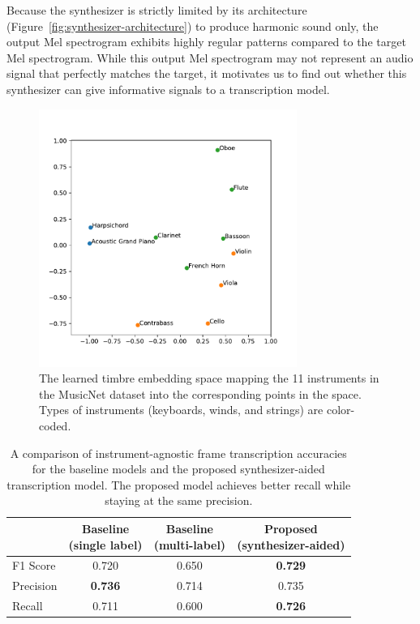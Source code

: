 Because the synthesizer is strictly limited by its architecture (Figure~\ref{fig:synthesizer-architecture}) to produce harmonic sound only, the output Mel spectrogram exhibits highly regular patterns compared to the target Mel spectrogram.
While this output Mel spectrogram may not represent an audio signal that perfectly matches the target, it motivates us to find out whether this synthesizer can give informative signals to a transcription model.

\begin{figure}
	\centering
	\includegraphics[width=0.75\textwidth]{cosine_distance.pdf}
	\vspace{-1em}
	\caption{The learned timbre embedding space mapping the 11 instruments in the MusicNet dataset into the corresponding points in the space. Types of instruments (keyboards, winds, and strings) are color-coded.}\label{fig:learned-timbre-embedding}
\end{figure}

\begin{table}
	\centering\small
	\begin{tabular}{l|ccc}
		& \makecell{Baseline \\ (single label)} & \makecell{Baseline \\ (multi-label)} & \makecell{Proposed \\ (synthesizer-aided)} \\ \hline
		F1 Score & 0.720 & 0.650 & \textbf{0.729} \\
		Precision & \textbf{0.736} & 0.714 & 0.735 \\
		Recall & 0.711 & 0.600 & \textbf{0.726} \\
	\end{tabular}
	\vspace{1em}
	\caption{A comparison of instrument-agnostic frame transcription accuracies for the baseline models and the proposed synthesizer-aided transcription model. The proposed model achieves better recall while staying at the same precision.}\label{tab:transcription-accuracy-comparison}
\end{table}

